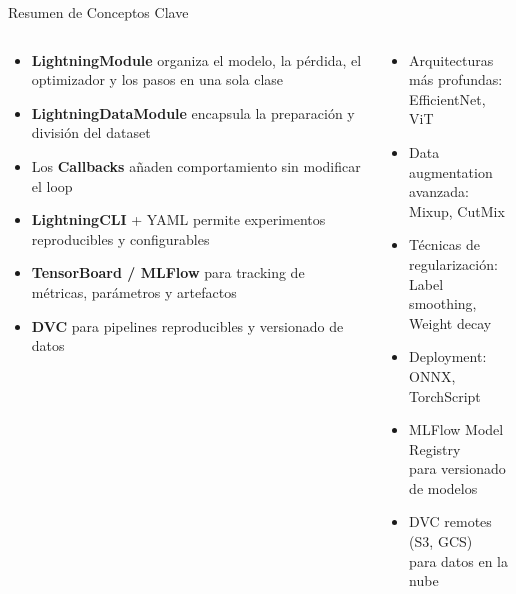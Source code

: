 \documentclass[aspectratio=169,10pt]{beamer}
\begin{document}
\begin{frame}{Resumen de Conceptos Clave}
    \begin{columns}
        \begin{tcolorbox}[colback=pyblue!10, colframe=pyblue, title=Aprendimos...]
            \small
            \begin{itemize}
                \item \textbf{LightningModule} organiza el modelo, la pérdida, el optimizador y los pasos en una sola clase
                \item \textbf{LightningDataModule} encapsula la preparación y división del dataset
                \item Los \textbf{Callbacks} añaden comportamiento sin modificar el loop
                \item \textbf{LightningCLI} + YAML permite experimentos reproducibles y configurables
                \item \textbf{TensorBoard / MLFlow} para tracking de métricas, parámetros y artefactos
                \item \textbf{DVC} para pipelines reproducibles y versionado de datos
            \end{itemize}
        \end{tcolorbox}

        \begin{tcolorbox}[colback=darkgreen!10, colframe=darkgreen, title=Próximos pasos]
            \small
            \begin{itemize}
                \item Arquitecturas más profundas:\\EfficientNet, ViT
                \item Data augmentation avanzada:\\Mixup, CutMix
                \item Técnicas de regularización:\\Label smoothing, Weight decay
                \item Deployment:\\ONNX, TorchScript
                \item MLFlow Model Registry\\para versionado de modelos
                \item DVC remotes (S3, GCS)\\para datos en la nube
            \end{itemize}
        \end{tcolorbox}
    \end{columns}
\end{frame}
\end{document}
